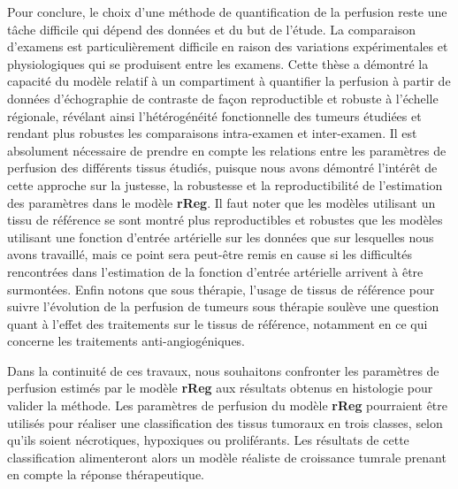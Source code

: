 \begin{otherlanguage}{francais}
Pour conclure, le choix d'une m\'ethode de quantification de la perfusion reste une t\^ache difficile qui d\'epend des donn\'ees et du but de l'\'etude.
La comparaison d'examens est particuli\`erement difficile en raison des variations exp\'erimentales et physiologiques qui se produisent entre les examens.
Cette th\`ese a d\'emontr\'e la capacit\'e du mod\`ele relatif \`a un compartiment \`a quantifier la perfusion \`a partir de donn\'ees d'\'echographie de contraste de fa\c{c}on reproductible et robuste \`a l'\'echelle r\'egionale, r\'ev\'elant ainsi l'h\'et\'erog\'en\'eit\'e fonctionnelle des tumeurs \'etudi\'ees et rendant plus robustes les comparaisons intra-examen et inter-examen.
Il est absolument n\'ecessaire de prendre en compte les relations entre les param\`etres de perfusion des diff\'erents tissus \'etudi\'es, puisque nous avons d\'emontr\'e l'int\'er\^et de cette approche sur la justesse, la robustesse et la reproductibilit\'e de l'estimation des param\`etres dans le mod\`ele \textbf{rReg}.
Il faut noter que les mod\`eles utilisant un tissu de r\'ef\'erence se sont montr\'e plus reproductibles et robustes que les mod\`eles utilisant une fonction d'entr\'ee art\'erielle sur les donn\'ees que sur lesquelles nous avons travaill\'e, mais ce point sera peut-\^etre remis en cause si les difficult\'es rencontr\'ees dans l'estimation de la fonction d'entr\'ee art\'erielle arrivent \`a \^etre surmont\'ees.
Enfin notons que sous th\'erapie, l'usage de tissus de r\'ef\'erence pour suivre l'\'evolution de la perfusion de tumeurs sous th\'erapie soul\`eve une question quant \`a l'effet des traitements sur le tissus de r\'ef\'erence, notamment en ce qui concerne les traitements anti-angiog\'eniques.

Dans la continuit\'e de ces travaux, nous souhaitons confronter les param\`etres de perfusion estim\'es par le mod\`ele \textbf{rReg} aux r\'esultats obtenus en histologie pour valider la m\'ethode.
Les param\`etres de perfusion du mod\`ele \textbf{rReg} pourraient \^etre utilis\'es pour r\'ealiser une classification des tissus tumoraux en trois classes, selon qu'ils soient n\'ecrotiques, hypoxiques ou prolif\'erants.
Les r\'esultats de cette classification alimenteront alors un mod\`ele r\'ealiste de croissance tumrale prenant en compte la r\'eponse th\'erapeutique.

\end{otherlanguage}